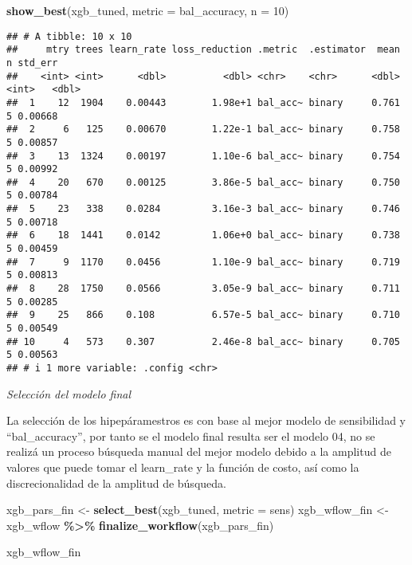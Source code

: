 \documentclass[
]{article}
\newenvironment{Shaded}{\begin{snugshade}}{\end{snugshade}}
\newcommand{\AttributeTok}[1]{\textcolor[rgb]{0.13,0.29,0.53}{#1}}
\newcommand{\DecValTok}[1]{\textcolor[rgb]{0.00,0.00,0.81}{#1}}
\newcommand{\FunctionTok}[1]{\textcolor[rgb]{0.13,0.29,0.53}{\textbf{#1}}}
\newcommand{\NormalTok}[1]{#1}
\newcommand{\OtherTok}[1]{\textcolor[rgb]{0.56,0.35,0.01}{#1}}
\newcommand{\SpecialCharTok}[1]{\textcolor[rgb]{0.81,0.36,0.00}{\textbf{#1}}}
\newcommand{\StringTok}[1]{\textcolor[rgb]{0.31,0.60,0.02}{#1}}
\begin{document}
\begin{Shaded}
\begin{Highlighting}[]
\FunctionTok{show\_best}\NormalTok{(xgb\_tuned, }\AttributeTok{metric =} \StringTok{\textquotesingle{}bal\_accuracy\textquotesingle{}}\NormalTok{, }\AttributeTok{n =} \DecValTok{10}\NormalTok{)}
\end{Highlighting}
\end{Shaded}

\begin{verbatim}
## # A tibble: 10 x 10
##     mtry trees learn_rate loss_reduction .metric  .estimator  mean     n std_err
##    <int> <int>      <dbl>          <dbl> <chr>    <chr>      <dbl> <int>   <dbl>
##  1    12  1904    0.00443        1.98e+1 bal_acc~ binary     0.761     5 0.00668
##  2     6   125    0.00670        1.22e-1 bal_acc~ binary     0.758     5 0.00857
##  3    13  1324    0.00197        1.10e-6 bal_acc~ binary     0.754     5 0.00992
##  4    20   670    0.00125        3.86e-5 bal_acc~ binary     0.750     5 0.00784
##  5    23   338    0.0284         3.16e-3 bal_acc~ binary     0.746     5 0.00718
##  6    18  1441    0.0142         1.06e+0 bal_acc~ binary     0.738     5 0.00459
##  7     9  1170    0.0456         1.10e-9 bal_acc~ binary     0.719     5 0.00813
##  8    28  1750    0.0566         3.05e-9 bal_acc~ binary     0.711     5 0.00285
##  9    25   866    0.108          6.57e-5 bal_acc~ binary     0.710     5 0.00549
## 10     4   573    0.307          2.46e-8 bal_acc~ binary     0.705     5 0.00563
## # i 1 more variable: .config <chr>
\end{verbatim}

\emph{Selección del modelo final}

La selección de los hipepáramestros es con base al mejor modelo de
sensibilidad y ``bal\_accuracy'', por tanto se el modelo final resulta
ser el modelo 04, no se realizá un proceso búsqueda manual del mejor
modelo debido a la amplitud de valores que puede tomar el learn\_rate y
la función de costo, así como la discrecionalidad de la amplitud de
búsqueda.

\begin{Shaded}
\begin{Highlighting}[]
\NormalTok{xgb\_pars\_fin }\OtherTok{\textless{}{-}} \FunctionTok{select\_best}\NormalTok{(xgb\_tuned, }\AttributeTok{metric =} \StringTok{\textquotesingle{}sens\textquotesingle{}}\NormalTok{)}
\NormalTok{xgb\_wflow\_fin }\OtherTok{\textless{}{-}}
\NormalTok{  xgb\_wflow }\SpecialCharTok{\%\textgreater{}\%}
  \FunctionTok{finalize\_workflow}\NormalTok{(xgb\_pars\_fin)}

\NormalTok{xgb\_wflow\_fin}
\end{Highlighting}
\end{Shaded}
\end{document}
